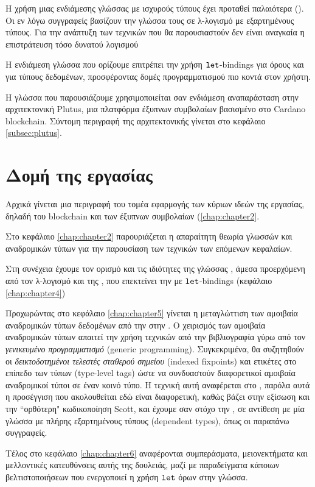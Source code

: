  Η χρήση μιας ενδιάμεσης γλώσσας με ισχυρούς τύπους έχει προταθεί παλαιότερα (\cite{henk}). Οι εν λόγω
  συγγραφείς βασίζουν την γλώσσα τους σε λ-λογισμό με εξαρτημένους τύπους. Για την ανάπτυξη των τεχνικών που θα παρουσιαστούν δεν είναι αναγκαία η επιστράτευση τόσο δυνατού λογισμού

  Η ενδιάμεση γλώσσα που ορίζουμε επιτρέπει την χρήση $\operatorname{\texttt{let}}$-bindings για όρους και για τύπους δεδομένων,
  προσφέροντας δομές προγραμματισμού πιο κοντά στον χρήστη.

  Η γλώσσα που παρουσιάζουμε χρησιμοποιείται σαν ενδιάμεση αναπαράσταση στην αρχιτεκτονική Plutus,
  μια πλατφόρμα έξυπνων συμβολαίων βασισμένο στο Cardano blockchain. Σύντομη περιγραφή της
  αρχιτεκτονικής γίνεται στο κεφάλαιο \ref{subsec:plutus}.

  \section{Δομή της εργασίας}

  Αρχικά γίνεται μια περιγραφή του τομέα εφαρμογής των κύριων ιδεών της εργασίας,
  δηλαδή του blockchain και των έξυπνων συμβολαίων (\ref{chap:chapter2}.

     Στο κεφάλαιο \ref{chap:chapter2}  παρουριάζεται η απαραίτητη θεωρία γλωσσών και αναδρομικών τύπων
      για την παρουσίαση των τεχνικών των επόμενων κεφαλαίων.

      Στη συνέχεια έχουμε τον ορισμό και τις ιδιότητες της γλώσσας \FOMF{}, άμεσα προερχόμενη από
      τον λ-λογισμό και της \FIR{}, που επεκτείνει την \FOMF{} με $\operatorname{\texttt{let}}$-bindings (κεφάλαιο \ref{chap:chapter4})

        Προχωρώντας στο κεφάλαιο \ref{chap:chapter5} γίνεται η μεταγλώττιση των αμοιβαία αναδρομικών τύπων
        δεδομένων από την \FIR{} στην \FOMF{}. Ο χειρισμός των αμοιβαία αναδρομικών τύπων απαιτεί
        την χρήση τεχνικών από την βιβλιογραφία γύρω από τον \emph{γενικευμένο προγραμματισμό} (generic
          programming). Συγκεκριμένα, θα  συζητηθούν οι \emph{δεικτοδοτημένοι τελεστές σταθερού σημείου}
        (indexed fixpoints) και ετικέτες στο επίπεδο των τύπων (type-level tags) ώστε να συνδυαστούν
        διαφορετικοί αμοιβαία αναδρομικοί τύποι σε έναν κοινό τύπο. Η τεχνική αυτή αναφέρεται στο
        \cite{fixmutualgeneric}, παρόλα αυτά η προσέγγιση που ακολουθείται εδώ είναι διαφορετική,
        καθώς βάζει στην εξίσωση και την ``ορθότερη" κωδικοποίηση Scott, και έχουμε σαν στόχο την \FOMF{},
        σε αντίθεση με μία γλώσσα με πλήρης εξαρτημένους τύπους (dependent types), όπως οι παραπάνω
        συγγραφείς.

        Tέλος στο κεφάλαιο \ref{chap:chapter6} αναφέρονται  συμπεράσματα, μειονεκτήματα και μελλοντικές κατευθύνσεις αυτής της δουλειάς, μαζί με παραδείγματα κάποιων βελτιστοποιήσεων που ενεργοποιεί η
        χρήση $\operatorname{\texttt{let}}$ όρων στην γλώσσα.
